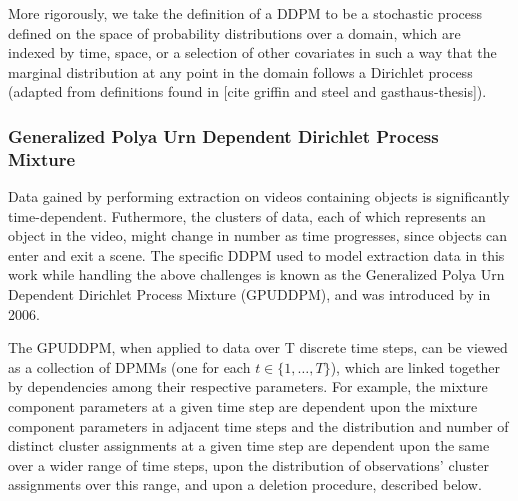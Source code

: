 \documentclass{article}
\begin{document}
More rigorously, we take the definition of a DDPM to be a stochastic process defined on the space of probability distributions over a domain, which are indexed by time, space, or a selection of other covariates in such a way that the marginal distribution at any point in the domain follows a Dirichlet process (adapted from definitions found in [cite griffin and steel and gasthaus-thesis]).



\subsubsection{Generalized Polya Urn Dependent Dirichlet Process Mixture}

Data gained by performing extraction on videos containing objects is significantly time-dependent. Futhermore, the clusters of data, each of which represents an object in the video, might change in number as time progresses, since objects can enter and exit a scene. The specific DDPM used to model extraction data in this work while handling the above challenges is known as the Generalized Polya Urn Dependent Dirichlet Process Mixture (GPUDDPM), and was introduced by \cite{caron_2006} in 2006. 

The GPUDDPM, when applied to data over T discrete time steps, can be viewed as a collection of DPMMs (one for each $t \in \{1, \ldots, T \}$), which are linked together by dependencies among their respective parameters. For example, the mixture component parameters at a given time step are dependent upon the mixture component parameters in adjacent time steps and the distribution and number of distinct cluster assignments at a given time step are dependent upon the same over a wider range of time steps, upon the distribution of observations' cluster assignments over this range, and upon a deletion procedure, described below.
\end{document}
